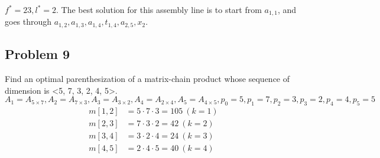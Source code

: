 \documentclass[a4paper]{article}
\makeatletter
\newenvironment{solution}
  {\begin{proof}[Solution]}
  {\end{proof}}
\renewenvironment{proof}[1][\proofname]{%
  \par\pushQED{\qed}\normalfont%
  \topsep6\p@\@plus6\p@\relax
  \trivlist\item[\hskip\labelsep\bfseries#1\@addpunct{.}]%
  \ignorespaces
}{%
  \popQED\endtrivlist\@endpefalse
}
\makeatother
\begin{document}
\begin{solution}
  $f^* = 23, l^* = 2$. The best solution for this assembly line is to start from $a_{1,1}$, and goes through $a_{1,2}, a_{1,3}, a_{1,4}, t_{1,4}, a_{2,5}, x_2$.
\end{solution}

\subsection*{Problem 9}
Find an optimal parenthesization of a matrix-chain product whose sequence of dimension is <5, 7, 3, 2, 4, 5>. \\
$A_1 = A_{5 \times 7}, A_2 = A_{7 \times 3}, A_3 = A_{3 \times 2}, A_4 = A_{2 \times 4}, A_5 = A_{4 \times 5}, p_0 = 5\label{p0}, p_1 = 7, p_2 = 3, p_3 = 2, p_4 = 4, p_5 = 5$\\
\begin{align*}
  m[1,2] &= 5 \cdot 7 \cdot 3 = 105\ (k = 1) \\
  m[2,3] &= 7 \cdot 3 \cdot 2 = 42\ (k = 2) \\
  m[3,4] &= 3 \cdot 2 \cdot 4 = 24\ (k = 3) \\
  m[4,5] &= 2 \cdot 4 \cdot 5 = 40\ (k = 4) \\
\end{align*}
\end{document}
